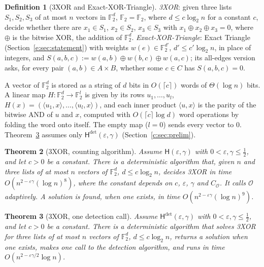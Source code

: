 \documentclass[11pt]{article}
\newtheorem{theorem}{Theorem}[section]
\theoremstyle{definition}
\newtheorem{definition}[theorem]{Definition}
\theoremstyle{remark}
\newcommand{\F}{\mathbb{F}_2}
\newcommand{\Hyp}{\mathsf{H}}
\begin{document}
\begin{definition}[3XOR and Exact-XOR-Triangle]\label{x:def:xor}
\emph{3XOR}: given three lists $S_1,S_2,S_3$ of at most $n$ vectors in $\F^d$, $\F=\mathbb F_2$, where $d\le c\log_2n$ for a constant $c$, decide whether there are $x_1\in S_1$, $x_2\in S_2$, $x_3\in S_3$ with $x_1\oplus x_2\oplus x_3=0$, where $\oplus$ is the bitwise XOR, the addition of $\F^d$. \emph{Exact-XOR-Triangle}: Exact Triangle (Section~\ref{e:sec:statement}) with weights $w(e)\in\F^{d'}$, $d'\le c'\log_2n$, in place of integers, and $S(a,b,c):=w(a,b)\oplus w(b,c)\oplus w(a,c)$; its all-edges version asks, for every pair $(a,b)\in A\times B$, whether some $c\in C$ has $S(a,b,c)=0$.
\end{definition}

A vector of $\F^d$ is stored as a string of $d$ bits in $O(\lceil c\rceil)$ words of $\Theta(\log n)$ bits. A linear map $H\colon\F^d\to\F^l$ is given by its rows $u_1,\dots,u_l$, $H(x)=(\langle u_1,x\rangle,\dots,\langle u_l,x\rangle)$, and each inner product $\langle u,x\rangle$ is the parity of the bitwise AND of $u$ and $x$, computed with $O(\lceil c\rceil\log d)$ word operations by folding the word onto itself. The empty map ($l=0$) sends every vector to $0$. Theorem~\ref{x:thm:xordet} assumes only $\Hyp^{\det}(\varepsilon,\gamma)$ (Section~\ref{c:sec:prelim}).

\begin{theorem}[3XOR, counting algorithm]\label{x:thm:xorcount}
Assume $\Hyp(\varepsilon,\gamma)$ with $0<\varepsilon,\gamma\le\frac12$, and let $c>0$ be a constant. There is a deterministic algorithm that, given $n$ and three lists of at most $n$ vectors of $\F^d$, $d\le c\log_2n$, decides 3XOR in time $O(n^{2-\varepsilon\gamma}(\log n)^8)$, where the constant depends on $c$, $\varepsilon$, $\gamma$ and $C_{\mathcal O}$. It calls $\mathcal O$ adaptively. A solution is found, when one exists, in time $O(n^{2-\varepsilon\gamma}(\log n)^9)$.
\end{theorem}

\begin{theorem}[3XOR, one detection call]\label{x:thm:xordet}
Assume $\Hyp^{\det}(\varepsilon,\gamma)$ with $0<\varepsilon,\gamma\le\frac12$, and let $c>0$ be a constant. There is a deterministic algorithm that solves 3XOR for three lists of at most $n$ vectors of $\F^d$, $d\le c\log_2n$, returns a solution when one exists, makes one call to the detection algorithm, and runs in time $O(n^{2-\varepsilon\gamma/2}\log n)$.
\end{theorem}
\end{document}
